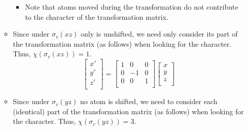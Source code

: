 \documentclass[../notes.tex]{subfiles}
\begin{document}
\begin{itemize}
\begin{itemize}
\begin{center}
        \end{center}
        \begin{itemize}
            \item Note that atoms moved during the transformation do not contribute to the character of the transformation matrix.
        \end{itemize}
        \item Since under $\sigma_v(xz)$ only  is unshifted, we need only consider its part of the transformation matrix (as follows) when looking for the character. Thus, $\chi(\sigma_v(xz))=1$.
        \begin{equation*}
            \begin{bmatrix}
                x'\\
                y'\\
                z'\\
            \end{bmatrix}
            =
            \begin{bmatrix}
                1 & 0 & 0\\
                0 & -1 & 0\\
                0 & 0 & 1\\
            \end{bmatrix}
            \begin{bmatrix}
                x\\
                y\\
                z\\
            \end{bmatrix}
        \end{equation*}
        \item Since under $\sigma_v(yz)$ no atom is shifted, we need to consider each (identical) part of the transformation matrix (as follows) when looking for the character. Thus, $\chi(\sigma_v(yz))=3$.

\end{itemize}
\end{itemize}
\end{document}
